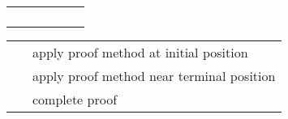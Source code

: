 \begin{isabellebody}
\begin{isamarkuptext}
\begin{tabular}{l|lllll}
    \hyperlink{attribute.elim}{\mbox{\isa{elim}}}\isa{{\isaliteral{22}{\isachardoublequote}}{\isaliteral{3F}{\isacharquery}}{\isaliteral{22}{\isachardoublequote}}} \hyperlink{attribute.intro}{\mbox{\isa{intro}}}\isa{{\isaliteral{22}{\isachardoublequote}}{\isaliteral{3F}{\isacharquery}}{\isaliteral{22}{\isachardoublequote}}}
      & \isa{{\isaliteral{22}{\isachardoublequote}}{\isaliteral{5C3C74696D65733E}{\isasymtimes}}{\isaliteral{22}{\isachardoublequote}}} \\
    \hyperlink{attribute.simp}{\mbox{\isa{simp}}}
      &                &                    &                      & \isa{{\isaliteral{22}{\isachardoublequote}}{\isaliteral{5C3C74696D65733E}{\isasymtimes}}{\isaliteral{22}{\isachardoublequote}}}         & \isa{{\isaliteral{22}{\isachardoublequote}}{\isaliteral{5C3C74696D65733E}{\isasymtimes}}{\isaliteral{22}{\isachardoublequote}}} \\
    \hyperlink{attribute.cong}{\mbox{\isa{cong}}}
      &                &                    &                      & \isa{{\isaliteral{22}{\isachardoublequote}}{\isaliteral{5C3C74696D65733E}{\isasymtimes}}{\isaliteral{22}{\isachardoublequote}}}         & \isa{{\isaliteral{22}{\isachardoublequote}}{\isaliteral{5C3C74696D65733E}{\isasymtimes}}{\isaliteral{22}{\isachardoublequote}}} \\
    \hyperlink{attribute.split}{\mbox{\isa{split}}}
      &                &                    &                      & \isa{{\isaliteral{22}{\isachardoublequote}}{\isaliteral{5C3C74696D65733E}{\isasymtimes}}{\isaliteral{22}{\isachardoublequote}}}         & \isa{{\isaliteral{22}{\isachardoublequote}}{\isaliteral{5C3C74696D65733E}{\isasymtimes}}{\isaliteral{22}{\isachardoublequote}}} \\
  \end{tabular}%
\end{isamarkuptext}%
\isamarkuptrue%
%
\isamarkuptrue%
%
\isamarkuptrue%
%
\begin{isamarkuptext}%
\begin{tabular}{ll}
    \hyperlink{command.apply}{\mbox{\isa{\isacommand{apply}}}}~\isa{m} & apply proof method at initial position \\
    \hyperlink{command.apply-end}{\mbox{\isa{\isacommand{apply{\isaliteral{5F}{\isacharunderscore}}end}}}}~\isa{m} & apply proof method near terminal position \\
    \hyperlink{command.done}{\mbox{\isa{\isacommand{done}}}} & complete proof \\

\end{tabular}
\end{isamarkuptext}
\end{isabellebody}
